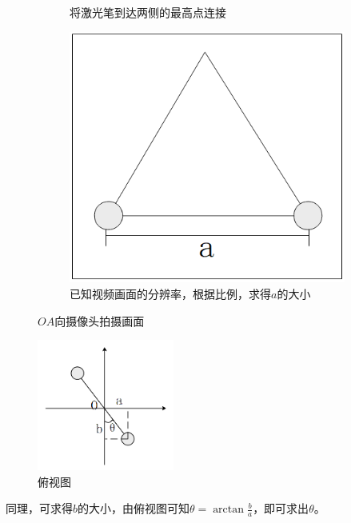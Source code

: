 \documentclass[scheme=chinese,a4paper]{article}
\begin{document}
\begin{figure}[H]
\begin{subfigure}[b]{0.3\textwidth}
      \caption{将激光笔到达两侧的最高点连接\\}
      \label{fig:three sin x}
    \end{subfigure}
    \hfill
    \begin{subfigure}[b]{0.3\textwidth}
      \centering
      \includegraphics[width=\textwidth]{c}
      \caption{已知视频画面的分辨率，根据比例，求得$a$的大小\\}
      \label{fig:five over x}
    \end{subfigure}
      \caption{$OA$向摄像头拍摄画面}
      \label{fig:three graphs}
\end{figure}

\begin{figure}[H]
  \centering
  \includegraphics[width=0.4\textwidth]{9.png}
  \caption{俯视图}
\end{figure}
同理，可求得$b$的大小，由俯视图可知$\theta=\arctan{\frac{b}{a}} $，即可求出$\theta$。
\end{document}
